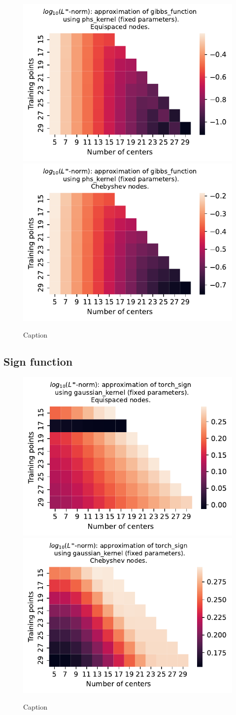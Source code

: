 \documentclass[12pt]{report} %
\begin{document}
\begin{figure}[ht]
    \centering
    
    \includegraphics[width=.49\textwidth]{imagenes/experiments/1d/least_squares/opt-gibbs_function-Kphs_kernel-Equi.pdf}
    \includegraphics[width=.49\textwidth]{imagenes/experiments/1d/least_squares/opt-gibbs_function-Kphs_kernel-Cheb.pdf}
    \caption{Caption}
    \label{fig:opt-gibbs-phs}
\end{figure}


\subsection*{Sign function}

\begin{figure}[ht]
    \centering
    
    \includegraphics[width=.49\textwidth]{imagenes/experiments/1d/least_squares/opt-torch_sign-Kgaussian_kernel-Equi.pdf}
    \includegraphics[width=.49\textwidth]{imagenes/experiments/1d/least_squares/opt-torch_sign-Kgaussian_kernel-Cheb.pdf}
    \caption{Caption}
    \label{fig:opt-torch-sign-gaussian}
\end{figure}
\end{document}
